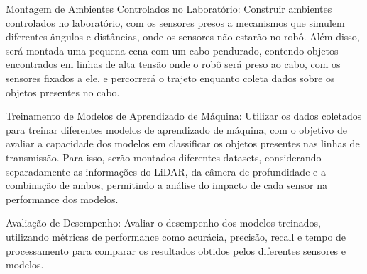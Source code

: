 Montagem de Ambientes Controlados no Laboratório: Construir ambientes controlados no laboratório, com os sensores presos a mecanismos que simulem diferentes ângulos e distâncias, onde os sensores não estarão no robô. Além disso, será montada uma pequena cena com um cabo pendurado, contendo objetos encontrados em linhas de alta tensão onde o robô será preso ao cabo, com os sensores fixados a ele, e percorrerá o trajeto enquanto coleta dados sobre os objetos presentes no cabo.

Treinamento de Modelos de Aprendizado de Máquina: Utilizar os dados coletados para treinar diferentes modelos de aprendizado de máquina, com o objetivo de avaliar a capacidade dos modelos em classificar os objetos presentes nas linhas de transmissão. Para isso, serão montados diferentes datasets, considerando separadamente as informações do LiDAR, da câmera de profundidade e a combinação de ambos, permitindo a análise do impacto de cada sensor na performance dos modelos.

Avaliação de Desempenho: Avaliar o desempenho dos modelos treinados, utilizando métricas de performance como acurácia, precisão, recall e tempo de processamento para comparar os resultados obtidos pelos diferentes sensores e modelos.


